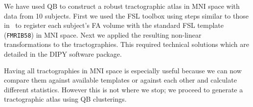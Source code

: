 \documentclass{bioinfo}
\begin{document}
We have used QB to construct a robust tractographic atlas in MNI space
with data from 10 subjects. First we used the FSL toolbox using steps
similar to those in~\cite{Smith2006NeuroImage} to register each
subject's FA volume with the standard FSL template (\texttt{FMRIB58}) in
MNI space. Next we applied the resulting non-linear transformations to
the tractographies. This required technical solutions which are detailed
in the DIPY software package.

Having all tractographies in MNI space is especially useful because we
can now compare them against available templates or against each other
and calculate different statistics. However this is not where we stop;
we proceed to generate a tractographic atlas using QB clusterings.

\end{document}
